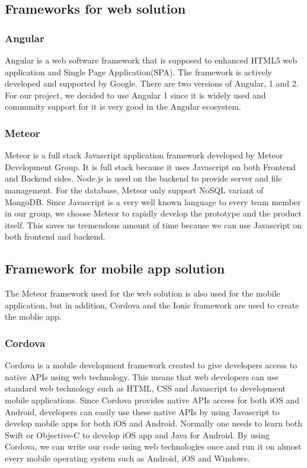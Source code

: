 \subsection{Frameworks for web solution}
\subsubsection{Angular}
Angular is a web software framework that is supposed to enhanced HTML5 web application and Single Page Application(SPA). The framework is actively developed and supported by Google. There are two versions of Angular, 1 and 2. For our project, we decided to use Angular 1 since it is widely used and community support for it is very good in the Angular ecosystem. 
\subsubsection{Meteor}
Meteor is a full stack Javascript application framework developed by Meteor Development Group. It is full stack because it uses Javascript on both Frontend and Backend sides. Node.js is used on the backend to provide server and file management. For the database, Meteor only support NoSQL variant of MongoDB. Since Javascript is a very well known language to every team member in our group, we choose Meteor to rapidly develop the prototype and the product itself. This saves us tremendous amount of time because we can use Javascript on both frontend and backend. 
\subsection{Framework for mobile app solution}
The Meteor framework used for the web solution is also used for the mobile application, but in addition, Cordova and the Ionic framework  are used to create the moblie app.
\subsubsection{Cordova}
Cordova is a mobile development framework created to give developers access to native APIs using web technology. This means that web developers can use standard web technology such as HTML, CSS and Javascript to development mobile applications. Since Cordova provides native APIs access for both iOS and Android, developers can easily use these native APIs by using Javascript to develop mobile apps for both iOS and Android. Normally one needs to learn both Swift or Objective-C to develop iOS app and Java for Android. By using Cordova, we can write our code using web technologies once and run it on almost every mobile operating system such as Android, iOS and Windows. 
